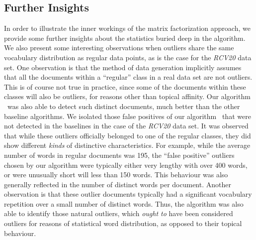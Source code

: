 
\subsection{Further Insights} \label{sec:insights}
In order to illustrate the inner workings of  the matrix
factorization approach, we provide some further insights about the
statistics buried deep in the algorithm. We also present some interesting
observations when outliers share the same vocabulary distribution as
regular data points, as is the case for the {\em RCV20} data set.
One observation is that the method of data generation implicitly
assumes that all the documents within a ``regular'' class in a real
data set are not outliers. This is of course not true in practice,
since some of the documents within these classes will also be
outliers, for reasons other than topical affinity.  Our algorithm
\algo\ was also able to  detect such distinct documents, much better
than the other baseline algorithms. We isolated those false
positives of our algorithm \algo\ that were not detected in the
baselines in the case of the {\em RCV20} data set. It was observed
that while these outliers officially belonged to one of the regular
classes, they did show different {\em kinds} of distinctive
characteristics. For example, while the average number of words in
regular documents was 195, the ``false positive'' outliers chosen by
our algorithm were typically either very lengthy with  over 400
words, or were unusually short will less than 150 words.  This
behaviour was also generally reflected in the number of distinct
words per document. Another observation is that these outlier
documents typically had a significant vocabulary repetition over a
small number of distinct words. Thus,  the algorithm was also able
to identify those natural outliers, which {\em ought to} have been
considered outliers for reasons of statistical word distribution, as
opposed to their topical behaviour.

